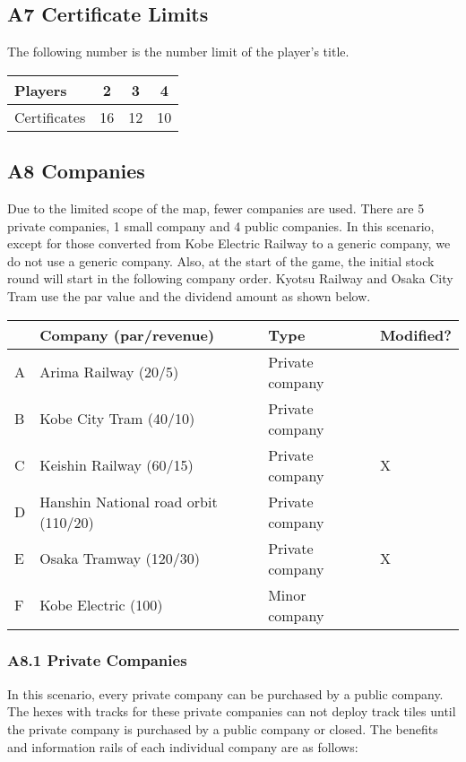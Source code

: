 \documentclass{article}
\begin{document}
\begin{CJK}{UTF8}{min}
\subsection*{A7 Certificate Limits}

The following number is the number limit of the player's title.


\begin{tabular}{|l|c|c|c|}
\hline
Players & 2 & 3 & 4 \\
\hline
Certificates & 16 & 12 & 10 \\
\hline
\end{tabular}


\subsection*{A8 Companies}

Due to the limited scope of the map, fewer companies are used. There
are 5 private companies, 1 small company and 4 public companies. In
this scenario, except for those converted from Kobe Electric Railway
to a generic company, we do not use a generic company. Also, at the
start of the game, the initial stock round will start in the following
company order. Kyotsu Railway and Osaka City Tram use the par value
and the dividend amount as shown below.

\begin{tabular}{llll}
 & Company (par/revenue) & Type & Modified? \\
\hline
A & Arima Railway (20/5) & Private company & \\
B & Kobe City Tram (40/10) & Private company & \\
C & Keishin Railway (60/15) & Private company & X \\
D & Hanshin National road orbit (110/20) & Private company & \\
E & Osaka Tramway (120/30) & Private company & X \\
F & Kobe Electric (100) & Minor company & \\
\end{tabular}

\subsubsection*{A8.1 Private Companies}

In this scenario, every private company can be purchased by a public
company. The hexes with tracks for these private companies can not
deploy track tiles until the private company is purchased by a public
company or closed. The benefits and information rails of each
individual company are as follows:


\end{CJK}
\end{document}
